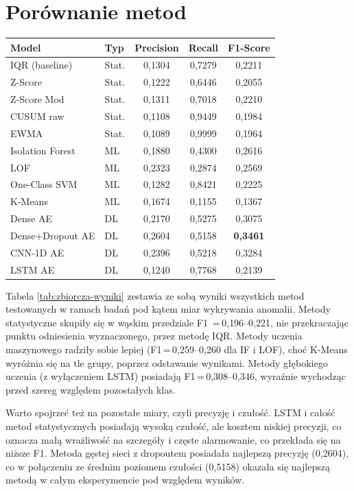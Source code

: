 \documentclass[a4paper,twoside,12pt]{book}
\begin{document}
	
	\section{Porównanie metod}
		
\begin{tabular}{llccc}
	\toprule
	\label{tab:zbiorcza-wyniki}
	\textbf{Model} & \textbf{Typ} & \textbf{Precision} 
	& \textbf{Recall} & \textbf{F1-Score} \\
	\midrule
	IQR (baseline)    & Stat. & 0{,}1304 & 0{,}7279 & 0{,}2211 \\
	Z-Score           & Stat. & 0{,}1222 & 0{,}6446 & 0{,}2055 \\
	Z-Score Mod       & Stat. & 0{,}1311 & 0{,}7018 & 0{,}2210 \\
	CUSUM raw         & Stat. & 0{,}1108 & 0{,}9449 & 0{,}1984 \\
	EWMA              & Stat. & 0{,}1089 & 0{,}9999 & 0{,}1964 \\
	\midrule
	Isolation Forest  & ML   & 0{,}1880 & 0{,}4300 & 0{,}2616 \\
	LOF               & ML   & 0{,}2323 & 0{,}2874 & 0{,}2569 \\
	One-Class SVM     & ML   & 0{,}1282 & 0{,}8421 & 0{,}2225 \\
	K-Means           & ML   & 0{,}1674 & 0{,}1155 & 0{,}1367 \\
	\midrule
	Dense AE          & DL   & 0{,}2170 & 0{,}5275 & 0{,}3075 \\
	Dense+Dropout AE  & DL   & 0{,}2604 & 0{,}5158 & \textbf{0{,}3461} \\
	CNN-1D AE         & DL   & 0{,}2396 & 0{,}5218 & 0{,}3284 \\
	LSTM AE           & DL   & 0{,}1240 & 0{,}7768 & 0{,}2139 \\
	\bottomrule
\end{tabular}
	
Tabela \ref{tab:zbiorcza-wyniki} zestawia ze sobą wyniki wszystkich metod testowanych w ramach badań pod kątem miar wykrywania anomalii. Metody statystyczne skupiły się w wąskim przedziale F1 \,=\,0{,}196--0{,}221, nie przekraczając punktu odniesienia wyznaczonego, przez metodę IQR. Metody uczenia maszynowego radziły sobie lepiej (F1\,=\,0{,}259--0{,}260 dla IF i LOF), choć K-Means wyróżnia się na tle grupy, poprzez odstawanie wynikami. Metody głębokiego uczenia (z wyłączeniem LSTM) posiadają F1\,=\,0{,}308--0{,}346, wyraźnie wychodząc przed szereg względem pozostałych klas.

Warto spojrzeć też na pozostałe miary, czyli precyzję i czułość. LSTM i całość metod statystycznych posiadają wysoką czułość, ale kosztem niskiej precyzji, co oznacza małą wrażliwość na szczegóły i częste alarmowanie, co przekłada się na niższe F1. Metoda gęstej sieci z dropoutem posiadała najlepszą precyzję (0{,}2604), co w połączeniu ze średnim poziomem czułości (0{,}5158) okazała się najlepszą metodą w całym eksperymencie pod względem wyników. 
\end{document}

